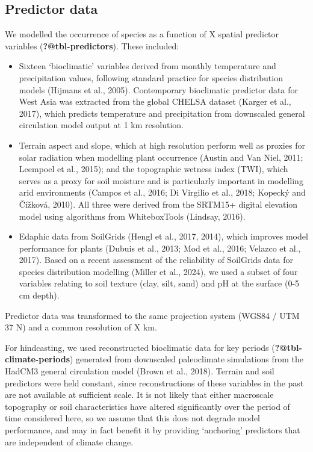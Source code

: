 \documentclass[
  number,
  review]{elsarticle}
\providecommand{\tightlist}{%
  \setlength{\itemsep}{0pt}\setlength{\parskip}{0pt}}\usepackage{longtable,booktabs,array}
\begin{document}
\subsection{Predictor data}\label{predictor-data}

We modelled the occurrence of species as a function of X spatial
predictor variables (\textbf{?@tbl-predictors}). These included:

\begin{itemize}
\tightlist
\item
  Sixteen `bioclimatic' variables derived from monthly temperature and
  precipitation values, following standard practice for species
  distribution models (Hijmans et al., 2005). Contemporary bioclimatic
  predictor data for West Asia was extracted from the global CHELSA
  dataset (Karger et al., 2017), which predicts temperature and
  precipitation from downscaled general circulation model output at 1 km
  resolution.
\end{itemize}

\begin{itemize}
\tightlist
\item
  Terrain aspect and slope, which at high resolution perform well as
  proxies for solar radiation when modelling plant occurrence (Austin
  and Van Niel, 2011; Leempoel et al., 2015); and the topographic
  wetness index (TWI), which serves as a proxy for soil moisture and is
  particularly important in modelling arid environments (Campos et al.,
  2016; Di Virgilio et al., 2018; Kopecký and Čížková, 2010). All three
  were derived from the SRTM15+ digital elevation model using algorithms
  from WhiteboxTools (Lindsay, 2016).
\end{itemize}

\begin{itemize}
\tightlist
\item
  Edaphic data from SoilGrids (Hengl et al., 2017, 2014), which improves
  model performance for plants (Dubuis et al., 2013; Mod et al., 2016;
  Velazco et al., 2017). Based on a recent assessment of the reliability
  of SoilGrids data for species distribution modelling (Miller et al.,
  2024), we used a subset of four variables relating to soil texture
  (clay, silt, sand) and pH at the surface (0-5 cm depth).
\end{itemize}

Predictor data was transformed to the same projection system (WGS84 /
UTM 37 N) and a common resolution of X km.

For hindcasting, we used reconstructed bioclimatic data for key periods
(\textbf{?@tbl-climate-periods}) generated from downscaled paleoclimate
simulations from the HadCM3 general circulation model (Brown et al.,
2018). Terrain and soil predictors were held constant, since
reconstructions of these variables in the past are not available at
sufficient scale. It is not likely that either macroscale topography or
soil characteristics have altered significantly over the period of time
considered here, so we assume that this does not degrade model
performance, and may in fact benefit it by providing `anchoring'
predictors that are independent of climate change.
\end{document}
